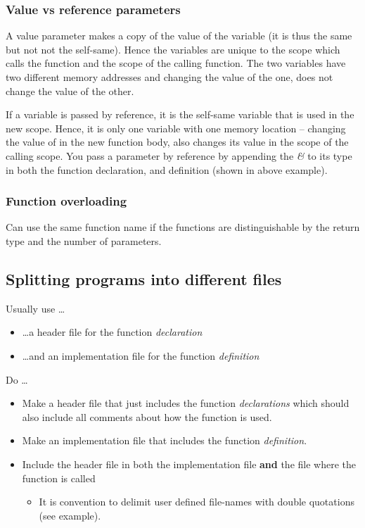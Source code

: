 \subsubsection*{Value vs reference parameters}
A value parameter makes a copy of the value of the variable (it is thus the same but not
not the self-same). Hence the variables are unique to the scope which calls the function and
the scope of the calling function. The two variables have two different memory addresses and
changing the value of the one, does not change the value of the other.

If a variable is passed by reference, it is the self-same variable that is used in the new
scope. Hence, it is only one variable with one memory location -- changing the value of in the
new function body, also changes its value in the scope of the calling scope. You pass a parameter
by reference by appending the \emph{\&} to its type in both the function declaration, and definition
(shown in above example).

\subsubsection*{Function overloading}
Can use the same function name if the functions are distinguishable by the return type and the number of parameters.



\subsection{Splitting programs into different files}
Usually use \ldots
\begin{itemize}
	\item \ldots a header file for the function \emph{declaration}
	\item \ldots and an implementation file for the function \emph{definition}
\end{itemize}
 
 \noindent
Do \ldots
\begin{itemize}
	\item Make a header file that just includes the function \emph{declarations} which should
	also include all comments about how the function is used.
	\item Make an implementation file that includes the function \emph{definition}.
	\item Include the header file in both the implementation file \textbf{and} the file where the function
	is called
	\begin{itemize}
		\item It is convention to delimit user defined file-names with double quotations (see example).
	\end{itemize}
\end{itemize}

